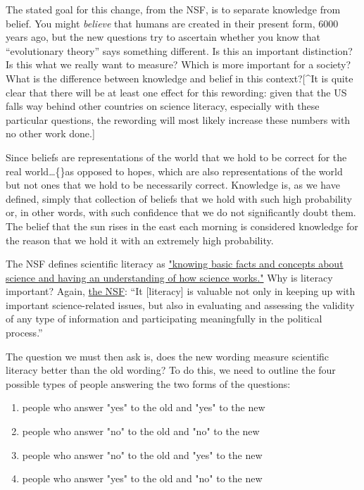 \documentclass{tufte-book}
\begin{document}
The stated goal for this change, from the NSF, is to separate knowledge
from belief. You might \emph{believe} that humans are created in their
present form, 6000 years ago, but the new questions try to ascertain
whether you know that ``evolutionary theory'' says something different.
Is this an important distinction? Is this what we really want to
measure? Which is more important for a society? What is the difference
between knowledge and belief in this context?{[}\^{}It is quite clear
that there will be at least one effect for this rewording: given that
the US falls way behind other countries on science literacy, especially
with these particular questions, the rewording will most likely increase
these numbers with no other work done.{]}

Since beliefs are representations of the world that we hold to be
correct for the real world\ldots\{\}as opposed to hopes, which are also
representations of the world but not ones that we hold to be necessarily
correct. Knowledge is, as we have defined, simply that collection of
beliefs that we hold with such high probability or, in other words, with
such confidence that we do not significantly doubt them. The belief that
the sun rises in the east each morning is considered knowledge for the
reason that we hold it with an extremely high probability.

The NSF defines scientific literacy as
\href{http://www.nsf.gov/statistics/seind04/c7/c7s2.htm}{"knowing basic
facts and concepts about science and having an understanding of how
science works."} Why is literacy important? Again,
\href{http://www.nsf.gov/statistics/seind04/c7/c7s2.htm}{the NSF}: ``It
{[}literacy{]} is valuable not only in keeping up with important
science-related issues, but also in evaluating and assessing the
validity of any type of information and participating meaningfully in
the political process.''

The question we must then ask is, does the new wording measure
scientific literacy better than the old wording? To do this, we need to
outline the four possible types of people answering the two forms of the
questions:

\begin{enumerate}
\def\labelenumi{\arabic{enumi}.}
\itemsep1pt\parskip0pt
\item
  people who answer "yes" to the old and "yes" to the new
\item
  people who answer "no" to the old and "no" to the new
\item
  people who answer "no" to the old and "yes" to the new
\item
  people who answer "yes" to the old and "no" to the new
\end{enumerate}
\end{document}
